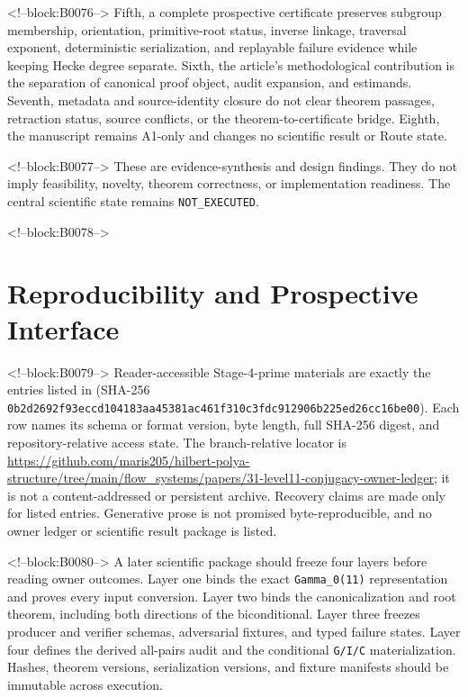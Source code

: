 \documentclass[11pt]{article}
\begin{document}
<!--block:B0076-->
Fifth, a complete prospective certificate preserves subgroup membership,
orientation, primitive-root status, inverse linkage, traversal exponent,
deterministic serialization, and replayable failure evidence while
keeping Hecke degree separate. Sixth, the article's methodological
contribution is the separation of canonical proof object, audit
expansion, and estimands. Seventh, metadata and source-identity closure
do not clear theorem passages, retraction status, source conflicts, or
the theorem-to-certificate bridge. Eighth, the manuscript remains A1-only
and changes no scientific result or Route state.

<!--block:B0077-->
These are evidence-synthesis and design findings. They do not imply
feasibility, novelty, theorem correctness, or implementation readiness.
The central scientific state remains \texttt{NOT\_EXECUTED}.

<!--block:B0078-->
\hypertarget{6-reproducibility-and-prospective-interface}{%
\section{Reproducibility and Prospective
Interface}\label{6-reproducibility-and-prospective-interface}}

<!--block:B0079-->
Reader-accessible Stage-4-prime materials are exactly the entries listed in
 (SHA-256
\texttt{0b2d2692f93eccd104183aa45381ac461f310c3fdc912906b225ed26cc16be00}).  Each row names its schema or format version, byte
length, full SHA-256 digest, and repository-relative access state.  The
branch-relative locator is
\url{https://github.com/maris205/hilbert-polya-structure/tree/main/flow_systems/papers/31-level11-conjugacy-owner-ledger};
it is not a content-addressed or persistent archive.  Recovery claims are made
only for listed entries.  Generative prose is not promised byte-reproducible,
and no owner ledger or scientific result package is listed.

<!--block:B0080-->
A later scientific package should freeze four layers before reading
owner outcomes. Layer one binds the exact \texttt{Gamma\_0(11)}
representation and proves every input conversion. Layer two binds the
canonicalization and root theorem, including both directions of the
biconditional. Layer three freezes producer and verifier schemas,
adversarial fixtures, and typed failure states. Layer four defines the
derived all-pairs audit and the conditional \texttt{G/I/C}
materialization. Hashes, theorem versions, serialization versions, and
fixture manifests should be immutable across execution.
\end{document}
